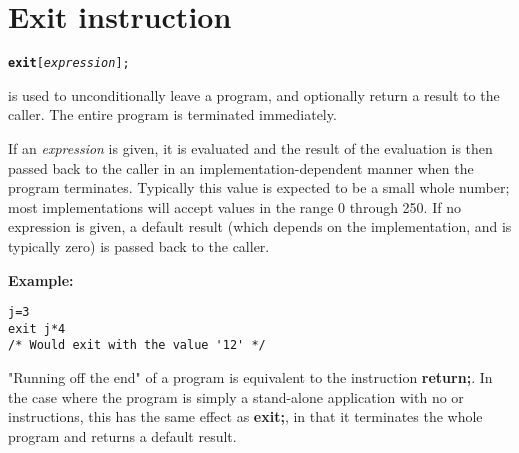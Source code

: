 \chapter{Exit instruction}\label{refexit}
\begin{shaded}
\begin{alltt}
\textbf{exit} [\emph{expression}];
\end{alltt}
\end{shaded}
  is used to unconditionally leave a program, and
optionally return a result to the caller.
The entire program is terminated immediately.

If an \emph{expression} is given, it is evaluated and the result
of the evaluation is then passed back to the caller in an
implementation-dependent manner when the program terminates.
Typically this value is expected to be a small whole number; most
implementations will accept values in the range 0 through 250.
If no expression is given, a default result (which depends on the
implementation, and is typically zero) is passed back to the caller.

\textbf{Example:}
\begin{lstlisting}
j=3
exit j*4
/* Would exit with the value '12' */
\end{lstlisting}
 "Running off the end" of a program is equivalent to the
instruction \textbf{return;}.  In the case where the program is simply
a stand-alone application with no  or 
instructions, this has the same effect as \textbf{exit;}, in that it
terminates the whole program and returns a default result.
